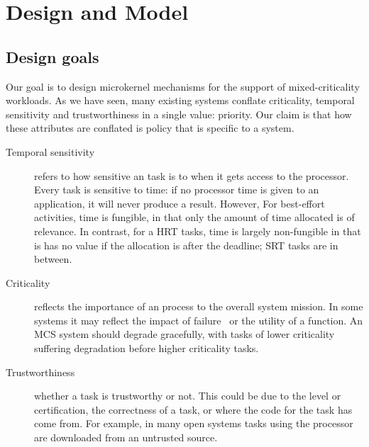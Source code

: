 \chapter{Design and Model}
\label{chap:model}

%




\section{Design goals}



Our goal is to design microkernel mechanisms for the support of mixed-criticality workloads.
As we have seen, many existing systems conflate criticality, temporal sensitivity and
trustworthiness in a single value: priority. Our claim is that how these attributes are conflated is
policy that is specific to a system.

\begin{description}
\item[Temporal sensitivity] refers to how sensitive an task is to when it gets access to the
    processor. Every task is sensitive to time: if no processor time is given to an
    application, it will never produce a result. However, For best-effort activities, time is
    fungible, in that only the amount of time allocated is of relevance. In contrast, for a
    \gls{HRT} tasks, time is largely non-fungible in that is has no value if the allocation is
    after the deadline; \gls{SRT} tasks are in between.
\item[Criticality] reflects the importance of an process to the overall system mission. In some
    systems it may reflect the impact of failure~\citep{ARINC653} or the utility of a function. An
    MCS system should degrade gracefully, with tasks of lower criticality suffering degradation
    before higher criticality tasks.
\item[Trustworthiness] whether a task is trustworthy or not. This could be due to the level or
    certification, the correctness of a task, or where the code for the task has come from. For
    example, in many open systems tasks using the processor are downloaded from an untrusted source.
\end{description}


